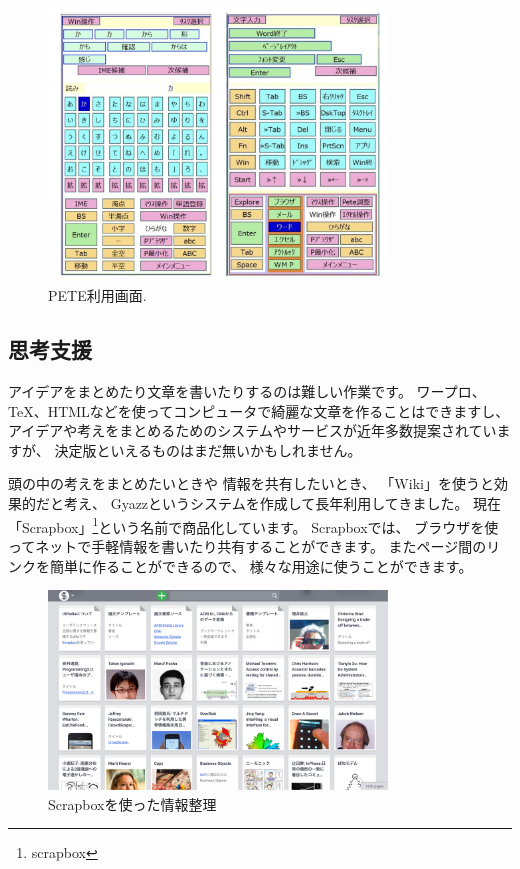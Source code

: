 \documentclass[topics]{compsoft} %
\begin{document}
\begin{figure}[h]
  \includegraphics[width=9cm,bb=0 0 1456 1172]{figures/a2f652e2f488b96974e92f8198f49469.jpg}
  \caption{PETE利用画面.}
  \label{pete}
\end{figure}


\subsection{思考支援}

アイデアをまとめたり文章を書いたりするのは難しい作業です。
ワープロ、{\TeX}、HTMLなどを使ってコンピュータで綺麗な文章を作ることはできますし、
アイデアや考えをまとめるためのシステムやサービスが近年多数提案されていますが、
決定版といえるものはまだ無いかもしれません。

頭の中の考えをまとめたいときや
情報を共有したいとき、
「Wiki」を使うと効果的だと考え、
Gyazz\cite{gyazz}というシステムを作成して長年利用してきました。
現在「Scrapbox」\footnote{scrapbox}という名前で商品化しています。
Scrapboxでは、
ブラウザを使ってネットで手軽情報を書いたり共有することができます。
またページ間のリンクを簡単に作ることができるので、
様々な用途に使うことができます。

\begin{figure}[t]
  \includegraphics[width=9cm,bb=0 0 2607 1535]{figures/13982c755fdc0c60af2548c0a6589543.png}
  \caption{Scrapboxを使った情報整理}
  \label{example1}
\end{figure}
\end{document}
